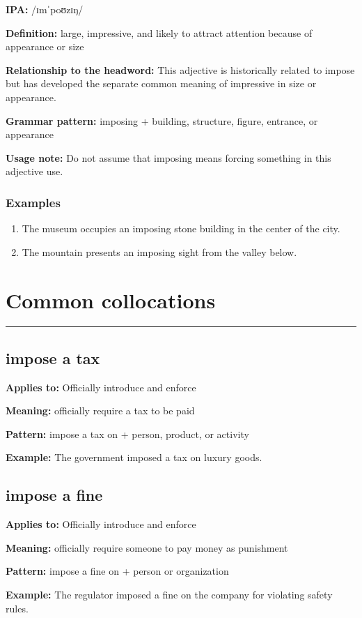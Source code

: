 \documentclass[11pt]{article}
\newcommand{\sectionrule}{\par\vspace{-0.5em}\noindent\textcolor{Accent}{\rule{\linewidth}{0.6pt}}\par}
\begin{document}
\textbf{IPA:} /ɪmˈpoʊzɪŋ/

\textbf{Definition:} large, impressive, and likely to attract attention because of appearance or size

\textbf{Relationship to the headword:} This adjective is historically related to impose but has developed the separate common meaning of impressive in size or appearance.

\textbf{Grammar pattern:} imposing + building, structure, figure, entrance, or appearance

\textbf{Usage note:} Do not assume that imposing means forcing something in this adjective use.

\subsubsection{Examples}
\begin{enumerate}
  \item The museum occupies an imposing stone building in the center of the city.
  \item The mountain presents an imposing sight from the valley below.
\end{enumerate}

\section{Common collocations}
\sectionrule
\subsection{impose a tax}
\textbf{Applies to:} Officially introduce and enforce

\textbf{Meaning:} officially require a tax to be paid

\textbf{Pattern:} impose a tax on + person, product, or activity

\textbf{Example:} The government imposed a tax on luxury goods.

\subsection{impose a fine}
\textbf{Applies to:} Officially introduce and enforce

\textbf{Meaning:} officially require someone to pay money as punishment

\textbf{Pattern:} impose a fine on + person or organization

\textbf{Example:} The regulator imposed a fine on the company for violating safety rules.
\end{document}
